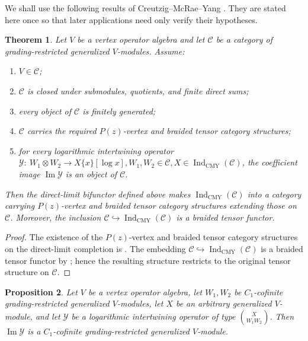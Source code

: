 \documentclass[10pt,a4paper]{amsart}
\numberwithin{equation}{section} \newtheorem{thm}{Theorem}[section] \newtheorem{lem}[thm]{Lemma} \newtheorem{ex}[thm]{Example} \newtheorem{prop}[thm]{Proposition} \newtheorem{cor}[thm]{Corollary} \newtheorem{defi}[thm]{Definition} \newtheorem{rmk}[thm]{Remark} \newtheorem{notation}[thm]{Notation}
\newcommand{\IndCMY}{\operatorname{Ind}_{\mathrm{CMY}}}
\begin{document}
We shall use the following results of Creutzig--McRae--Yang \cite{CMY}. They are stated here once so that later applications need only verify their hypotheses.

\begin{thm}
\label{thm:CMY-direct-limit}
Let $V$ be a vertex operator algebra and let $\mathcal C$ be a category of grading-restricted generalized $V$-modules. Assume:
\begin{enumerate}[label=\textnormal{(\arabic*)}]
\item $V\in\mathcal C$;
\item $\mathcal C$ is closed under submodules, quotients, and finite
direct sums;
\item every object of $\mathcal C$ is finitely generated;
\item $\mathcal C$ carries the required $P(z)$-vertex and braided
tensor category structures;
\item for every logarithmic intertwining operator
\(\mathcal Y:\ W_1\otimes W_2\longrightarrow X\{x\}[\log x], W_1,W_2\in\mathcal C,X\in\IndCMY(\mathcal C)\), the coefficient image $\operatorname{Im}\mathcal Y$ is an object of $\mathcal C$.
\end{enumerate}
Then the direct-limit bifunctor defined above makes $\IndCMY(\mathcal C)$ into a category carrying $P(z)$-vertex and braided tensor category structures extending those on $\mathcal C$. Moreover, the inclusion \(\mathcal C\hookrightarrow\IndCMY(\mathcal C)\) is a braided tensor functor.
\end{thm}

\begin{proof}
The existence of the $P(z)$-vertex and braided tensor category structures on the direct-limit completion is \cite[Theorem~1.1]{CMY}. The embedding $\mathcal C\hookrightarrow\IndCMY(\mathcal C)$ is a braided tensor functor by \cite[Theorem~5.4]{CMY}; hence the resulting structure restricts to the original tensor structure on $\mathcal C$.
\end{proof}

\begin{prop}
\label{prop:CMY-coefficient-image}
Let $V$ be a vertex operator algebra, let $W_1,W_2$ be $C_1$-cofinite grading-restricted generalized $V$-modules, let $X$ be an arbitrary generalized $V$-module, and let $\mathcal Y$ be a logarithmic intertwining operator of type \(\binom{X}{W_1 W_2}.\) Then \(\operatorname{Im}\mathcal Y\) is a $C_1$-cofinite grading-restricted generalized $V$-module.
\end{prop}
\end{document}
